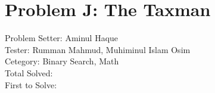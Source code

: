 \section*{Problem J: The Taxman}
Problem Setter: Aminul Haque \\
Tester: Rumman Mahmud,  Muhiminul Islam Osim \\
Cetegory: Binary Search, Math \\
Total Solved:  \\
First to Solve: \\
